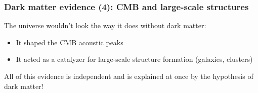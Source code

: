 \documentclass{beamer}
\begin{document}
\begin{frame}
\frametitle{Dark matter evidence (4): CMB and large-scale structures}
The universe wouldn't look the way it does without dark matter:
\begin{itemize}
	\item It shaped the CMB acoustic peaks
	\item It acted as a catalyzer for large-scale structure formation (galaxies, clusters)
\end{itemize}
\pause
All of this evidence is independent and is explained at once by the hypothesis of dark matter!
\end{frame}
\end{document}
